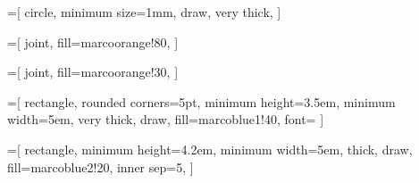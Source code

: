 =[
 	circle,
	minimum size=1mm,
    draw,
    very thick,
]

=[
    joint,
    fill=marcoorange!80,
]

=[
    joint,
    fill=marcoorange!30,
]

=[
    rectangle,
    rounded corners=5pt,
    minimum height=3.5em,
    minimum width=5em,
    very thick,
    draw,
    fill=marcoblue1!40,
    font=\footnotesize
]

=[
    rectangle,
    minimum height=4.2em,
    minimum width=5em,
    thick,
    draw,
    fill=marcoblue2!20,
    inner sep=5,
]

